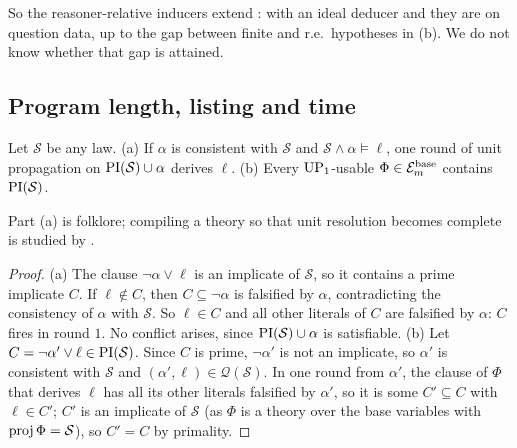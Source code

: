 So the reasoner-relative inducers extend \SAIabbr: with an ideal deducer and \Ethree{} they are \SAIabbr on question data, up to the gap between finite and r.e.\ hypotheses in (b). We do not know whether that gap is attained.

\subsection{Program length, listing and time}\label{app:shape:invisible}

\begin{lemma}\label{lem:shape:PI}
Let $\mathcal S$ be any law.
(a) If $\alpha$ is consistent with $\mathcal S$ and $\mathcal S\wedge\alpha\models\ell$, one round of unit propagation on $\mathrm{PI}(\mathcal S)\cup\alpha$ derives $\ell$.
(b) Every $\mathrm{UP}_1$-usable $\Phi\in\mathcal E^{\rm base}_m$ contains $\mathrm{PI}(\mathcal S)$.
\end{lemma}

Part (a) is folklore; compiling a theory so that unit resolution becomes complete is studied by \citet{delval1994tractable}.

\begin{proof}
(a) The clause $\neg\alpha\vee\ell$ is an implicate of $\mathcal S$, so it contains a prime implicate $C$. If $\ell\notin C$, then $C\subseteq\neg\alpha$ is falsified by $\alpha$, contradicting the consistency of $\alpha$ with $\mathcal S$. So $\ell\in C$ and all other literals of $C$ are falsified by $\alpha$: $C$ fires in round $1$. No conflict arises, since $\mathrm{PI}(\mathcal S)\cup\alpha$ is satisfiable.
(b) Let $C=\neg\alpha'\vee\ell\in\mathrm{PI}(\mathcal S)$. Since $C$ is prime, $\neg\alpha'$ is not an implicate, so $\alpha'$ is consistent with $\mathcal S$ and $(\alpha',\ell)\in\mathcal Q(\mathcal S)$. In one round from $\alpha'$, the clause of $\Phi$ that derives $\ell$ has all its other literals falsified by $\alpha'$, so it is some $C'\subseteq C$ with $\ell\in C'$; $C'$ is an implicate of $\mathcal S$ (as $\Phi$ is a theory over the base variables with $\operatorname{proj}\Phi=\mathcal S$), so $C'=C$ by primality.
\end{proof}

